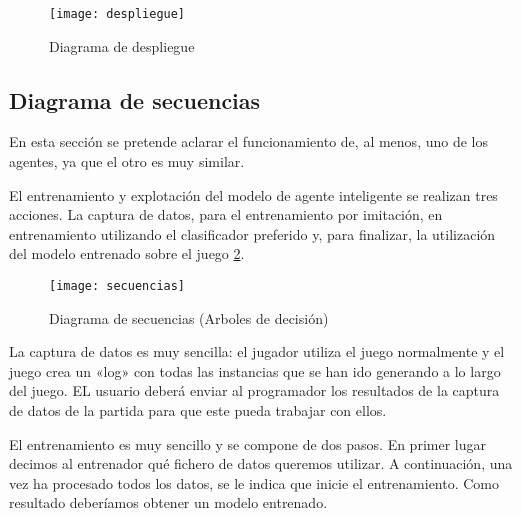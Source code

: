 \begin{figure}
    \centering
    \texttt{[image: despliegue]}
    \caption{Diagrama de despliegue}
    \label{fig:d_desp}
\end{figure}


\subsection {Diagrama de secuencias}
En esta sección se pretende aclarar el funcionamiento de, al menos, uno de los agentes, ya que el otro es muy similar.

El entrenamiento y explotación del modelo de agente inteligente se realizan tres acciones. La captura de datos, para el entrenamiento por imitación, en entrenamiento utilizando el clasificador preferido y, para finalizar, la utilización del modelo entrenado sobre el juego \ref{fig:d_sec}. 


\begin{figure}
    \centering
    \texttt{[image: secuencias]}
    \caption{Diagrama de secuencias (Arboles de decisión)}
    \label{fig:d_sec}
\end{figure}

La captura de datos es muy sencilla: el jugador utiliza el juego normalmente y el juego crea un «log» con todas las instancias que se han ido generando a lo largo del juego. EL usuario deberá enviar al programador los resultados de la captura de datos de la partida para que este pueda trabajar con ellos.

El entrenamiento es muy sencillo y se compone de dos pasos. En primer lugar decimos al entrenador qué fichero de datos queremos utilizar. A continuación, una vez ha procesado todos los datos, se le indica que inicie el entrenamiento. Como resultado deberíamos obtener un modelo entrenado.

